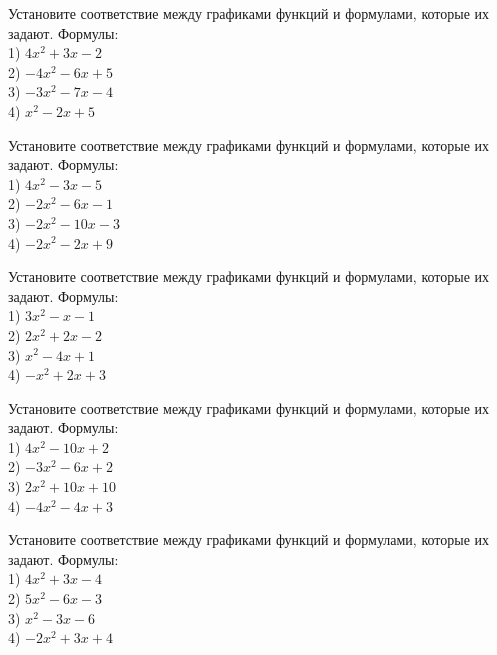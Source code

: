 \documentclass[4apaper]{article}
\begin{document}
\begin{taskBN}{17}
Установите соответствие между графиками функций и формулами, которые их задают. Формулы: \\1) $4x^2+3x-2$\\2) $-4x^2-6x+5$\\3) $-3x^2-7x-4$\\4) $x^2-2x+5$
\end{taskBN}

\begin{taskBN}{18}
Установите соответствие между графиками функций и формулами, которые их задают. Формулы: \\1) $4x^2-3x-5$\\2) $-2x^2-6x-1$\\3) $-2x^2-10x-3$\\4) $-2x^2-2x+9$
\end{taskBN}

\begin{taskBN}{19}
Установите соответствие между графиками функций и формулами, которые их задают. Формулы: \\1) $3x^2-x-1$\\2) $2x^2+2x-2$\\3) $x^2-4x+1$\\4) $-x^2+2x+3$
\end{taskBN}

\begin{taskBN}{20}
Установите соответствие между графиками функций и формулами, которые их задают. Формулы: \\1) $4x^2-10x+2$\\2) $-3x^2-6x+2$\\3) $2x^2+10x+10$\\4) $-4x^2-4x+3$
\end{taskBN}

\begin{taskBN}{21}
Установите соответствие между графиками функций и формулами, которые их задают. Формулы: \\1) $4x^2+3x-4$\\2) $5x^2-6x-3$\\3) $x^2-3x-6$\\4) $-2x^2+3x+4$
\end{taskBN}
\end{document}
